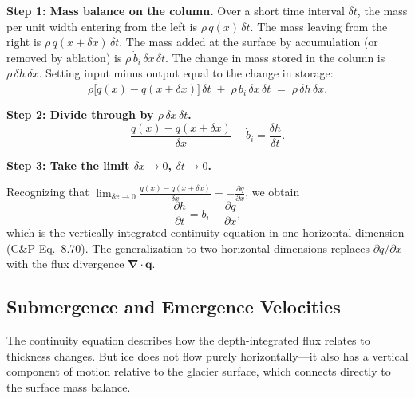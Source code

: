 \documentclass[11pt]{article}
\begin{document}
\begin{tcolorbox}[
  colback=orange!25,
  colframe=orange!70!black,
  title={\textbf{Derivation: The Vertically Integrated Continuity Equation}},
  fonttitle=\bfseries,
  breakable
]
\medskip
\noindent\textbf{Step 1: Mass balance on the column.}
Over a short time interval $\delta t$, the mass per unit width entering from the left is $\rho\, q(x)\,\delta t$. The mass leaving from the right is $\rho\, q(x + \delta x)\,\delta t$.  The mass added at the surface by accumulation (or removed by ablation) is $\rho\, \dot{b}_i\, \delta x\, \delta t$.  The change in mass stored in the column is $\rho\, \delta h\, \delta x$.  Setting input minus output equal to the change in storage:
\begin{equation}
  \rho\bigl[q(x) - q(x + \delta x)\bigr]\,\delta t \;+\; \rho\,\dot{b}_i\,\delta x\,\delta t \;=\; \rho\,\delta h\,\delta x.
\end{equation}

\medskip
\noindent\textbf{Step 2: Divide through by $\rho\,\delta x\,\delta t$.}
\begin{equation}
  \frac{q(x) - q(x + \delta x)}{\delta x} + \dot{b}_i = \frac{\delta h}{\delta t}.
\end{equation}

\medskip
\noindent\textbf{Step 3: Take the limit $\delta x \to 0$, $\delta t \to 0$.}

Recognizing that $\displaystyle\lim_{\delta x \to 0} \frac{q(x) - q(x + \delta x)}{\delta x} = -\frac{\partial q}{\partial x}$, we obtain
\begin{equation}
  \boxed{\frac{\partial h}{\partial t} = \dot{b}_i - \frac{\partial q}{\partial x}},
\end{equation}
which is the vertically integrated continuity equation in one horizontal dimension (C\&P Eq.~8.70).  The generalization to two horizontal dimensions replaces $\partial q / \partial x$ with the flux divergence $\bm{\nabla} \cdot \bm{q}$.
\end{tcolorbox}

\subsection{Submergence and Emergence Velocities}

The continuity equation describes how the depth-integrated flux relates to thickness changes.  But ice does not flow purely horizontally---it also has a vertical component of motion relative to the glacier surface, which connects directly to the surface mass balance.
\end{document}
